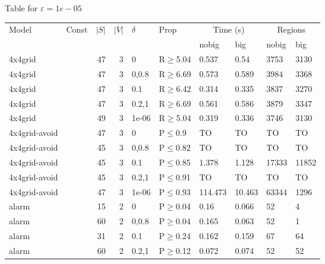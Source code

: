 \small Table for \(\varepsilon=1e-05\)
\begin{longtable}{llrrllllll}

        \toprule
        Model & Const & $|S|$ & $|V|$ & $\delta$ & Prop & \multicolumn{2}{c}{Time (s)} & \multicolumn{2}{c}{Regions} \\
        \cmidrule(ll){7-8} \cmidrule(ll){9-10}
        & & & & & & nobig & big & nobig & big \\
        \midrule
        
 4x4grid       &           &     	47 &   3 & 0     & R$\geq$5.04  & 0.537    & 0.54     & 3753    & 3130   \\
 4x4grid       &           &     	47 &   3 & 0,0.8 & R$\geq$6.69  & 0.573    & 0.589    & 3984    & 3368   \\
 4x4grid       &           &     	47 &   3 & 0.1   & R$\geq$6.42  & 0.314    & 0.335    & 3837    & 3270   \\
 4x4grid       &           &     	47 &   3 & 0.2,1 & R$\geq$6.69  & 0.561    & 0.586    & 3879    & 3347   \\
 4x4grid       &           &     	49 &   3 & 1e-06 & R$\geq$5.04  & 0.319    & 0.336    & 3746    & 3130   \\
 4x4grid-avoid &           &     	47 &   3 & 0     & P$\leq$0.9   & TO       & TO       & TO      & TO     \\
 4x4grid-avoid &           &     	45 &   3 & 0,0.8 & P$\leq$0.82  & TO       & TO       & TO      & TO     \\
 4x4grid-avoid &           &     	45 &   3 & 0.1   & P$\leq$0.85  & 1.378    & 1.128    & 17333   & 11852  \\
 4x4grid-avoid &           &     	45 &   3 & 0.2,1 & P$\leq$0.91  & TO       & TO       & TO      & TO     \\
 4x4grid-avoid &           &     	47 &   3 & 1e-06 & P$\leq$0.93  & 114.473  & 10.463   & 63344   & 1296   \\
 alarm         &           &     	15 &   2 & 0     & P$\geq$0.04  & 0.16     & 0.066    & 52      & 4      \\
 alarm         &           &     	60 &   2 & 0,0.8 & P$\geq$0.04  & 0.165    & 0.063    & 52      & 1      \\
 alarm         &           &     	31 &   2 & 0.1   & P$\geq$0.24  & 0.162    & 0.159    & 67      & 64     \\
 alarm         &           &     	60 &   2 & 0.2,1 & P$\geq$0.12  & 0.072    & 0.074    & 52      & 52     \\

\end{longtable}
